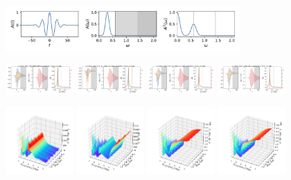 \documentclass[a4paper]{article}
\begin{document}
\begin{figure}[H]
  \centering
  \includegraphics[width=0.8\textwidth]{A2.pdf}
\end{figure}
\begin{figure}[H]
  \centering
  \includegraphics[width=0.23\textwidth]{HL-A2-v5-imp0.pdf}
  \includegraphics[width=0.23\textwidth]{HL-A2-v5-imp1.pdf}
  \includegraphics[width=0.23\textwidth]{HL-A2-v5-imp2.pdf}
  \includegraphics[width=0.23\textwidth]{HL-A2-v5-imp3.pdf}
\end{figure}
\begin{figure}[H]
  \centering
  \includegraphics[width=0.23\textwidth]{cond3d_real-A2-v5-imp0.pdf}
  \includegraphics[width=0.23\textwidth]{cond3d_real-A2-v5-imp1.pdf}
  \includegraphics[width=0.23\textwidth]{cond3d_real-A2-v5-imp2.pdf}
  \includegraphics[width=0.23\textwidth]{cond3d_real-A2-v5-imp3.pdf}
\end{figure}
\end{document}
